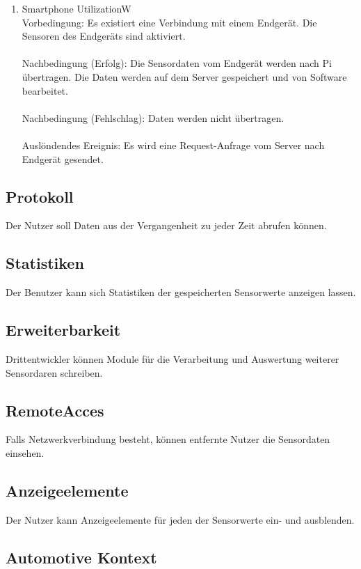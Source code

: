 \documentclass[pflichtenheft.tex]{subfiles}
\begin{document}
\begin{enumerate}
	\item{Smartphone UtilizationW}\\ Vorbedingung: Es existiert eine Verbindung mit einem Endgerät. Die Sensoren des Endgeräts sind aktiviert. \\ \\
		Nachbedingung (Erfolg): Die Sensordaten vom Endgerät werden nach Pi übertragen. Die Daten werden auf dem Server gespeichert und von Software bearbeitet. \\ \\
		Nachbedingung (Fehlschlag): Daten werden nicht übertragen. \\ \\
		Auslöndendes Ereignis: Es wird eine Request-Anfrage vom Server nach Endgerät gesendet.

\end{enumerate}

\subsection{\mkfa Protokoll} Der Nutzer soll Daten aus der Vergangenheit zu jeder Zeit abrufen können.

\subsection{\mkfa Statistiken} Der Benutzer kann sich Statistiken der gespeicherten Sensorwerte anzeigen lassen.

\subsection{\mkfa Erweiterbarkeit} Drittentwickler können Module für die Verarbeitung und Auswertung weiterer Sensordaren schreiben.

\subsection{\mkfa RemoteAcces} Falls Netzwerkverbindung besteht, können entfernte Nutzer die Sensordaten einsehen.

\subsection{\mkfa Anzeigeelemente} Der Nutzer kann Anzeigeelemente für jeden der Sensorwerte ein- und ausblenden.

\subsection{Automotive Kontext}
\end{document}
